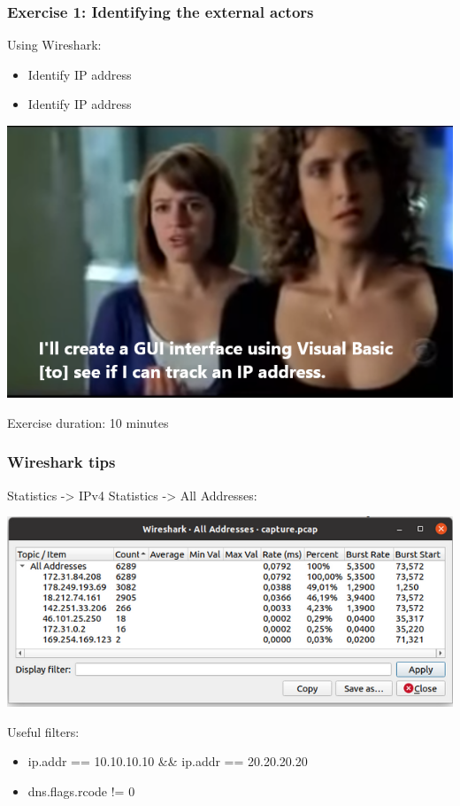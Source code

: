 \begin{frame}
    \frametitle{Exercise 1: Identifying the external actors }
    Using Wireshark:
    \begin{itemize}
    	\item Identify {\color{green}{\bf Player}} IP address
    	\item Identify {\color{red}{\bf Attacker}} IP address
    \end{itemize}
    \begin{center}\includegraphics[scale=0.45]{../pictures/csi-meme.png}\end{center}
    \begin{center}Exercise duration: 10 minutes\end{center}
\end{frame}

\begin{frame}
    \frametitle{Wireshark tips}
    Statistics -> IPv4 Statistics -> All Addresses:
	\begin{center}\includegraphics[scale=0.45]{../pictures/wireshark-statistics.png}\end{center}
	Useful filters:
    \begin{itemize}
    	\item ip.addr == 10.10.10.10 \&\& ip.addr == 20.20.20.20
    	\item dns.flags.rcode != 0
    \end{itemize}
\end{frame}

\begin{frame}
    \frametitle{}


\end{frame}
